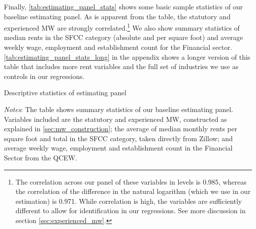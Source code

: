 Finally, \autoref{tab:estimating_panel_stats} shows some basic sample statistics of our 
baseline estimating panel. As is apparent from the table, the statutory and experienced
MW are strongly correlated.\footnote{The correlation across our panel of these variables 
	in levels is 0.985, whereas the correlation of the difference in the natural logarithm 
	(which we use in our estimation) is 0.971. While correlation is high, the variables 
	are sufficiently different to allow for identification in our regressions. See more
	discussion in section \ref{sec:experienced_mw}.}
We also show summary statistics of median rents in the SFCC category (absolute and per 
square foot) and average weekly wage, employment and establishment count for the Financial 
sector. \autoref{tab:estimating_panel_stats_long} in the appendix shows a longer version of 
this table that includes more rent variables and the full set of industries we use as controls 
in our regressions.

\begin{table}[h!]
	\caption{Descriptive statistics of estimating panel}
	\centering
	\label{tab:estimating_panel_stats}    
	
	\begin{minipage}{0.95\textwidth} \footnotesize
		\vspace{3mm} 
		\textit{Notes}: The table shows summary statistics of our baseline estimating panel.
		Variables included are the statutory and experienced MW, constructed as explained in
		\autoref{sec:mw_construction}; the average of median monthly rents per square foot 
		and total in the SFCC category, taken directly from Zillow; and average weekly wage, 
		employment and establishment count in the Financial Sector from the QCEW.
	\end{minipage}
\end{table}
